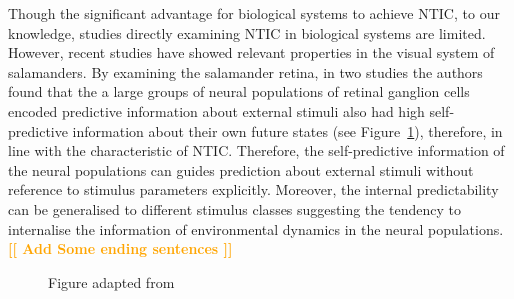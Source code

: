 \documentclass[utf8]{article}
\newcommand{\toWrite}[1]{\noindent
			\textcolor{Orange}{\textbf{[[ #1 ]]}}}
\newcommand{\includegraphicsTodo}[2][]{%
			\tcbox[%
				adjusted title=\LARGE To Be Modified,
				halign title=right,
				colbacktitle=Orange!75!White,
				coltitle=Black,
				colframe=Red!60!White,
				boxrule=1mm,
				colback=white%
				]{\texttt{[image: \#2]}}}
\begin{document}
			
			Though the significant advantage for biological systems to achieve NTIC, to our knowledge, studies directly examining NTIC in biological systems are limited. However,  recent studies have showed relevant properties in the visual system of salamanders. By examining the salamander retina, in two studies \citep{Palmer2015, sederberg2018learning} the authors found that the a large groups of neural populations of retinal ganglion cells encoded predictive information about external stimuli also had high self-predictive information about their own future states (see Figure~\ref{fig:sederberg2018learning}), therefore, in line with the characteristic of NTIC. Therefore, the self-predictive information of the neural populations can guides prediction about external stimuli without reference to stimulus parameters explicitly. Moreover, the internal predictability can be generalised to different stimulus classes suggesting the tendency to internalise the information of environmental dynamics in the neural populations. \toWrite{Add Some ending sentences}
				
			\begin{figure}[H]
				\includegraphicsTodo[width=\textwidth]{WritingMaterials/Palmer2015.png} 
				\caption{Figure adapted from \cite{sederberg2018learning}}
				\label{fig:sederberg2018learning}	
			\end{figure}			
			
\end{document}

